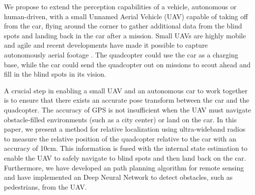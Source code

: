 We propose to extend the perception capabilities of a vehicle, autonomous or human-driven, with a small Unnamed Aerial Vehicle (UAV) capable of taking off from the car, flying around the corner to gather additional data from the blind spots and landing back in the car after a mission. Small UAVs are highly mobile and agile and recent developments have made it possible to capture autonomously aerial footage \cite{naegeli17letters}.
The quadcopter could use the car as a charging base,
while the car could send the quadcopter out on missions to scout ahead and
fill in the blind spots in its vision.



A crucial step in enabling a small UAV and an autonomous car to work
together is to ensure that there exists an accurate pose transform between the car
and the quadcopter. The accuracy of GPS is not insufficient when the UAV must navigate
obstacle-filled environments (such as a city center) or land on the car. In this 
paper, we present a method for relative localization using ultra-wideband radios to measure the relative position of the quadcopter relative to the car with an accuracy of 10cm. This information is fused with the internal state estimation to enable the UAV to safely navigate to blind spots and then land back on the car. Furthermore, we have developed an path planning algorithm for remote sensing and have implemented an Deep Neural Network to detect obstacles, such as pedestrians, from the UAV.

